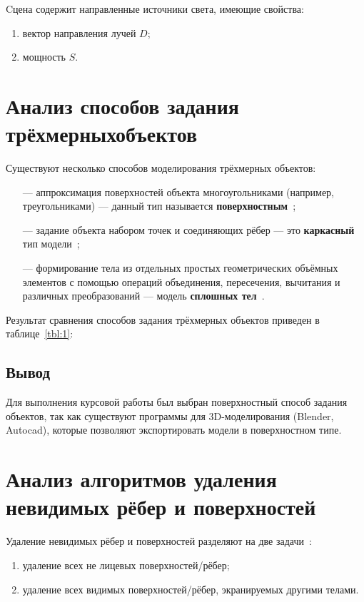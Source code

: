 Cцена содержит направленные источники света, имеющие свойства:
\begin{enumerate}
	\item вектор направления лучей $D$;
	\item мощность $S$.
\end{enumerate}

\section{Анализ способов задания трёхмерных\newline объектов}
Существуют несколько способов моделирования трёхмерных объектов:
\begin{itemize}
	\item[---] аппроксимация поверхностей объекта многоугольниками (например, треугольниками) --- данный тип называется \textbf{поверхностным}~\cite{rodjers};
	\item[---] задание объекта набором точек и соединяющих рёбер --- это \textbf{каркасный} тип модели~\cite{rodjers};
	\item[---] формирование тела  из отдельных простых геометрических объёмных элементов с помощью операций объединения, пересечения, вычитания и различных преобразований --- модель \textbf{сплошных тел}~\cite{rodjers}.
\end{itemize}

Результат сравнения способов задания трёхмерных объектов приведен в таблице~\ref{tbl:1}:


\subsection*{Вывод}

Для выполнения курсовой работы был выбран поверхностный способ задания объектов, так как существуют программы для 3D-моделирования (Blender, Autocad), которые позволяют экспортировать модели в поверхностном типе.

\section{Анализ алгоритмов удаления невидимых рёбер и поверхностей}
Удаление невидимых рёбер и поверхностей разделяют на две задачи~\cite{rodjers}:
\begin{enumerate}
	\item удаление всех не лицевых поверхностей/рёбер;
	\item удаление всех видимых поверхностей/рёбер, экранируемых другими телами.
\end{enumerate}

